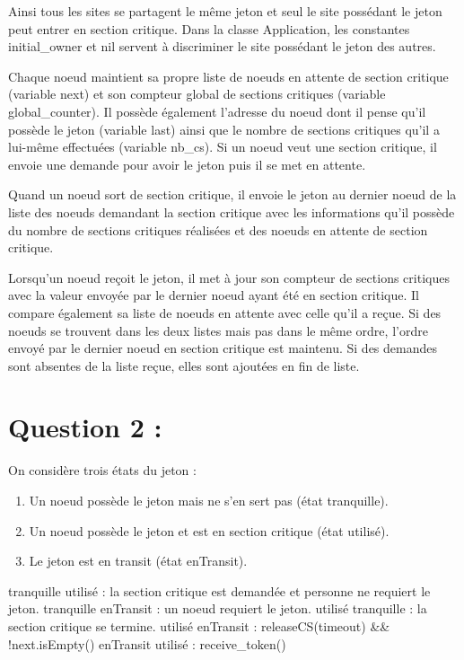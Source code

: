 \documentclass[11pt,a4paper]{report}
\begin{document}
Ainsi tous les sites se partagent le même jeton et seul le site possédant le jeton peut entrer en section critique. Dans la classe Application, les constantes initial\_owner et nil servent à discriminer le site possédant le jeton des autres.

Chaque noeud maintient sa propre liste de noeuds en attente de section critique (variable next) et son compteur global de sections critiques (variable global\_counter). Il possède également l'adresse du noeud dont il pense qu'il possède le jeton (variable last) ainsi que le nombre de sections critiques qu'il a lui-même effectuées (variable nb\_cs). Si un noeud veut une section critique, il envoie une demande pour avoir le jeton puis il se met en attente.

Quand un noeud sort de section critique, il envoie le jeton au dernier noeud de la liste des noeuds demandant la section critique avec les informations qu'il possède du nombre de sections critiques réalisées et des noeuds en attente de section critique.

Lorsqu'un noeud reçoit le jeton, il met à jour son compteur de sections critiques avec la valeur envoyée par le dernier noeud ayant été en section critique. Il compare également sa liste de noeuds en attente avec celle qu'il a reçue. Si des noeuds se trouvent dans les deux listes mais pas dans le même ordre, l'ordre envoyé par le dernier noeud en section critique est maintenu. Si des demandes sont absentes de la liste reçue, elles sont ajoutées en fin de liste.


\section{Question 2 :}

On considère trois états du jeton :
\begin{enumerate}
	\item Un noeud possède le jeton mais ne s’en sert pas (état tranquille).
	\item Un noeud possède le jeton et est en section critique (état utilisé).
	\item Le jeton est en transit (état enTransit).
\end{enumerate}

tranquille \to utilisé : la section critique est demandée et personne ne requiert le jeton.
tranquille \to enTransit : un noeud requiert le jeton.
utilisé \to tranquille : la section critique se termine.
utilisé \to enTransit : releaseCS(timeout) && !next.isEmpty()
enTransit \to utilisé : receive_token()
\end{document}
